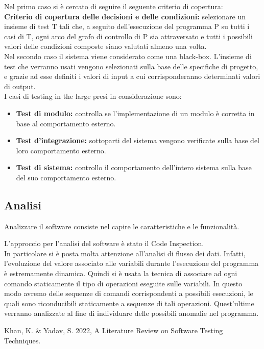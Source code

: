\documentclass[a4paper,final,12pt]{report}
\begin{document}
Nel primo caso si è cercato di seguire il seguente criterio di copertura:\\
\textbf{Criterio di copertura delle decisioni e delle condizioni:} selezionare un insieme di test T tali che, a seguito dell’esecuzione del programma P su tutti i casi di T, ogni arco del grafo di controllo di P sia attraversato e tutti i possibili valori delle condizioni composte siano valutati almeno una volta.
\\
Nel secondo caso il sistema viene considerato come una black-box. L'insieme di test che verranno usati vengono selezionati sulla base delle specifiche di progetto, e grazie ad esse definiti i valori di input a cui corrisponderanno determinati valori di output.\\
I casi di testing in the large presi in considerazione sono:
\begin{itemize}
\item \textbf{Test di modulo:} controlla se l'implementazione di un modulo è corretta in base al comportamento esterno.
\item \textbf{Test d'integrazione:} sottoparti del sistema vengono verificate sulla base del loro comportamento esterno.
\item \textbf{Test di sistema:} controllo il comportamento dell'intero sistema sulla  base del suo comportamento esterno. 
\end{itemize}

\subsection{Analisi}
Analizzare il software consiste nel capire le caratteristiche e le funzionalità.

L'approccio per l'analisi del software è stato il Code Inspection.\\
In particolare si è posta molta attenzione all'analisi di flusso dei dati.
Infatti, l'evoluzione del valore associato alle variabili durante l'esecuzione del programma è estremamente dinamica. Quindi si è usata la tecnica di associare ad ogni comando staticamente il tipo di operazioni eseguite sulle variabili. In questo modo avremo delle sequenze di comandi corrispondenti a possibili esecuzioni, le quali sono riconducibili staticamente a sequenze di tali operazioni. Quest'ultime verranno analizzate al fine di individuare delle possibili anomalie nel programma.


\begin{thebibliography}{100}
 Khan, K. \& Yadav, S. 2022, A Literature Review on Software Testing Techniques.
\end{thebibliography}
\end{document}
